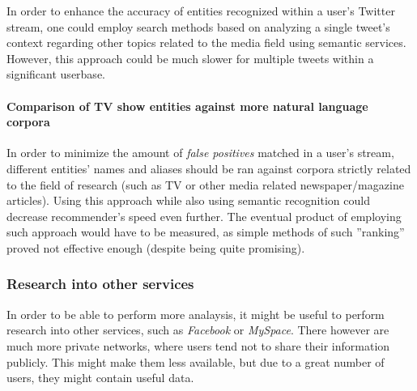 In order to enhance the accuracy of entities recognized within a user's Twitter
stream, one could employ search methods based on analyzing a single tweet's
context regarding other topics related to the media field using semantic
services.  However, this approach could be much slower for multiple tweets
within a significant userbase.

\paragraph{Comparison of TV show entities against more natural language corpora}

In order to minimize the amount of \textit{false positives} matched in a user's
stream, different entities' names and aliases should be ran against corpora
strictly related to the field of research (such as TV or other media related
newspaper/magazine articles). Using this approach while also using semantic
recognition could decrease recommender's speed even further. The eventual
product of employing such approach would have to be measured, as simple methods
of such ''ranking'' proved not effective enough (despite being quite
promising).

\subsubsection{Research into other services}

In order to be able to perform more analaysis, it might be useful to perform
research into other services, such as \textit{Facebook} or \textit{MySpace}.
There however are much more private networks, where users tend not to share
their information publicly. This might make them less available, but due to a
great number of users, they might contain useful data.
